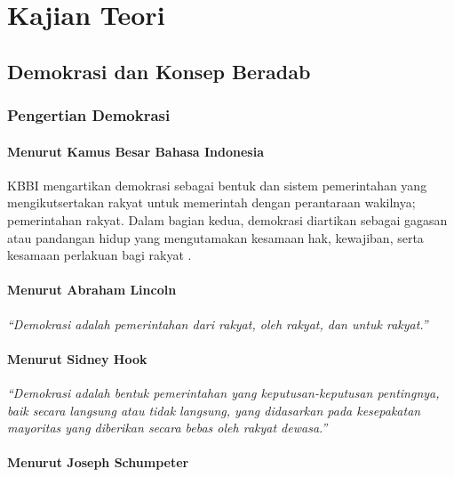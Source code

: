 \section{Kajian Teori} %


\subsection{Demokrasi dan Konsep Beradab}

\subsubsection{Pengertian Demokrasi}

\paragraph{Menurut Kamus Besar Bahasa Indonesia}

KBBI mengartikan demokrasi sebagai bentuk dan sistem pemerintahan yang mengikutsertakan rakyat untuk memerintah dengan perantaraan wakilnya; pemerintahan rakyat. Dalam bagian kedua, demokrasi diartikan sebagai gagasan atau pandangan hidup yang mengutamakan kesamaan hak, kewajiban, serta kesamaan perlakuan bagi rakyat \cite{kbbi}.

\paragraph{Menurut Abraham Lincoln}

\textit{“Demokrasi adalah pemerintahan dari rakyat, oleh rakyat, dan untuk rakyat.”}

\paragraph{Menurut Sidney Hook}

\textit{“Demokrasi adalah bentuk pemerintahan yang keputusan-keputusan pentingnya, baik secara langsung atau tidak langsung, yang didasarkan pada kesepakatan mayoritas yang diberikan secara bebas oleh rakyat dewasa.”}

\paragraph{Menurut Joseph Schumpeter}

